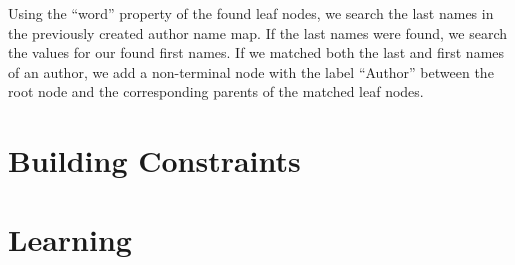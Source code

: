 Using the ``word'' property of the found leaf nodes, we search the last names in the previously created author name map.
If the last names were found, we search the values for our found first names.
If we matched both the last and first names of an author, we add a non-terminal node with the label ``Author'' between the root node and the corresponding parents of the matched leaf nodes.


\section{Building  Constraints}\label{sec:i-training-crfs}

\section{Learning }\label{sec:i-learning-crfs}
